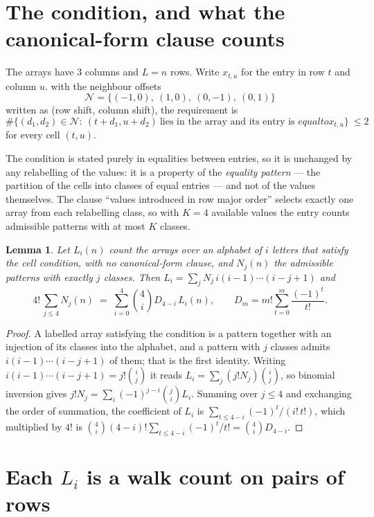\documentclass[11pt,a4paper]{article}
\theoremstyle{plain}
\newtheorem{lemma}[theorem]{Lemma}
\theoremstyle{definition}
\begin{document}
\section{The condition, and what the canonical-form clause counts}

The arrays have $3$ columns and $L=n$ rows. Write $x_{t,u}$ for the entry in
row $t$ and column $u$. with the neighbour offsets
\[
\mathcal N=\{(-1,0),\ (1,0),\ (0,-1),\ (0,1)\}
\]
written as (row shift, column shift), the requirement is
\begin{equation}\label{eq:loc}
\#\bigl\{(d_1,d_2)\in\mathcal N:\ (t+d_1,u+d_2)\ \text{lies in the array and its entry is }
equal to x_{t,u}\bigr\}\ \le2
\end{equation}
for every cell $(t,u)$.

The condition is stated purely in equalities between entries, so it is unchanged by any
relabelling of the values: it is a property of the \emph{equality pattern} --- the partition
of the cells into classes of equal entries --- and not of the values themselves. The clause
``values introduced in row major order'' selects exactly one array from each relabelling
class, so with $K=4$ available values the entry counts admissible patterns with at most $K$
classes.

\begin{lemma}\label{lem:inv}
Let $L_i(n)$ count the arrays over an alphabet of $i$ letters that satisfy the cell
condition, with no canonical-form clause, and $N_j(n)$ the admissible patterns with exactly
$j$ classes. Then $L_i=\sum_j N_j\,i(i-1)\cdots(i-j+1)$ and
\[
4!\,\sum_{j\le 4}N_j(n)\;=\;\sum_{i=0}^{4}\binom{4}{i}D_{4-i}\,L_i(n),
\qquad D_m=m!\sum_{t=0}^{m}\frac{(-1)^t}{t!} .
\]
\end{lemma}

\begin{proof}
A labelled array satisfying the condition is a pattern together with an injection of its
classes into the alphabet, and a pattern with $j$ classes admits $i(i-1)\cdots(i-j+1)$ of
them; that is the first identity. Writing $i(i-1)\cdots(i-j+1)=j!\binom{i}{j}$ it reads
$L_i=\sum_j(j!N_j)\binom{i}{j}$, so binomial inversion gives
$j!N_j=\sum_i(-1)^{j-i}\binom{j}{i}L_i$. Summing over $j\le4$ and exchanging the
order of summation, the coefficient of $L_i$ is
$\sum_{t\le4-i}(-1)^t/(i!\,t!)$, which multiplied by $4!$ is
$\binom{4}{i}(4-i)!\sum_{t\le4-i}(-1)^t/t!=\binom{4}{i}D_{4-i}$.
\end{proof}

\section{Each $L_i$ is a walk count on pairs of rows}
\end{document}
